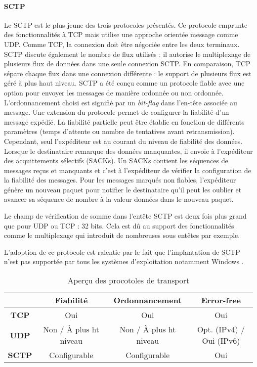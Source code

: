 \paragraph{SCTP}
Le \gls{SCTP} est le plus jeune des trois protocoles présentés. Ce protocole 
emprunte des fonctionnalités à \gls{TCP} mais utilise une approche orientée 
message comme \gls{UDP}. Comme \gls{TCP}, la connexion doit être négociée 
entre les deux terminaux. \gls{SCTP} discute également le nombre de flux utilisés 
: il autorise le multiplexage de plusieurs flux de données dans une seule 
connexion \gls{SCTP}. En comparaison, \gls{TCP} sépare chaque flux dans une 
connexion différente : le support de plusieurs flux est géré à plus haut niveau.
\gls{SCTP} a été conçu comme un protocole fiable avec une option pour envoyer 
les messages de manière ordonnée ou non ordonnée. L'ordonnancement choisi est 
signifié par un \textit{bit-flag} dans l'en-tête associée au message. Une extension 
du protocole permet de configurer la fiabilité d'un message expédié. La fiabilité 
partielle peut être établie en fonction de différents paramètres (temps d'attente ou 
nombre de tentatives 
avant retransmission). Cependant, seul l'expéditeur est au courant du niveau de 
fiabilité des données. Lorsque le destinataire remarque des données manquantes, 
il envoie à l'expéditeur des acquittements sélectifs (SACKs). Un SACKs contient 
les séquences de messages reçus et manquants et c'est à l'expéditeur de vérifier 
la configuration de la fiabilité des messages. Pour les messages marqués non 
fiables, l'expéditeur génère un nouveau paquet pour notifier le destinataire qu'il 
peut les \og oublier\fg{} et avancer sa séquence de nombre à la valeur données 
dans le nouveau paquet. 

Le champ de vérification de somme dans l'entête \gls{SCTP} est deux fois plus 
grand que pour \gls{UDP} ou \gls{TCP} : 32 bits. Cela est dû au support des 
fonctionnalités comme le multiplexage qui introduit de nombreuses sous entêtes 
par exemple.

L'adoption de ce protocole est ralentie par le fait que l'implantation de \gls{SCTP} 
n'est pas supportée par tous les systèmes d'exploitation notamment 
Windows \cite{Hogg}. 

\begin{table}[h]
	\caption{Aperçu des procotoles de transport}
	\noindent\small
	\begin{tabular}{cccc}
		& \textbf{Fiabilité} & \textbf{Ordonnancement} & \textbf{Error-free} \\ 
		\hline 
		\textbf{TCP} & Oui & Oui & Oui \\ 
		\hline 
		\textbf{UDP} & Non / À plus ht niveau & Non / À plus 
		ht 
		niveau & Opt. 
		(IPv4) / 
		Oui (IPv6) \\ 
		\hline 
		\textbf{SCTP} & Configurable & Configurable &  Oui \\ 
		\hline
	\end{tabular} 
\end{table}

